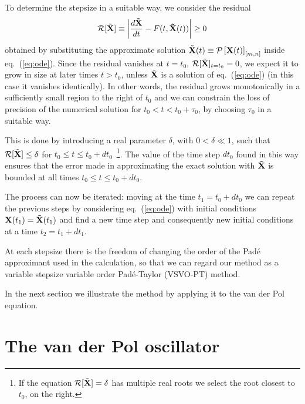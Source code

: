 \documentclass[final]{article}
\begin{document}
To determine the stepsize in a suitable way, we consider the residual 
\begin{equation}
\mathcal{R}[\tilde{\bf X}] \equiv \left|\frac{d{\bf \tilde{\bf X}}}{dt} - F(t,  {\bf \tilde{X}}(t)) \right| \geq 0
\end{equation}
obtained by substituting the approximate solution $\tilde{\bf X}(t) \equiv  \mathcal{P}\left[{\bf X}(t)\right]_{[m,n]}$ inside eq.~(\ref{eq:ode}). Since the residual vanishes at $t=t_0$,
$\mathcal{R}[\tilde{\bf X}]_{t=t_0}=0$, we expect it to grow in size at later times $t > t_0$, unless 
$\tilde{\bf X}$ is a solution of eq.~(\ref{eq:ode}) (in this case it vanishes identically). In other words, the residual grows monotonically in a sufficiently small region to the right of $t_0$ and we can constrain
the loss of precision of the numerical solution for $t_0 < t < t_0 +\tau_0$, by choosing $\tau_0$ in a suitable way.

This is done by introducing a real parameter $\delta$, with $0 < \delta \ll 1$,  such that $\mathcal{R}[\tilde{\bf X}] \leq \delta$ for $t_0 \leq t \leq t_0+dt_0$~\footnote{If  the equation $\mathcal{R}[\tilde{\bf X}] = \delta$  has multiple real roots we select the root closest to $t_0$, on the right.}.
The value of the time step $dt_0$ found in this way ensures that the error made in approximating the exact solution 
with ${\bf \tilde{X}}$ is bounded at all times $t_0 \leq t \leq t_0+dt_0$. 

The process can now be iterated: moving at the time $t_1=t_0+dt_0$ we can repeat the previous steps by considering eq.~(\ref{eq:ode}) with initial conditions ${\bf X}(t_1)= {\bf \tilde{X} }(t_1)$ and find a new time step and consequently new initial conditions at a time $t_2= t_1+dt_1$. 


At each stepsize there is the freedom of changing the order of the Pad\'e approximant used in the calculation, so that we can regard our method as a variable stepsize variable order Pad\'e-Taylor  (VSVO-PT) method.

In the next section we illustrate the method by applying it to the van der Pol equation.

\section{The van der Pol oscillator}
\label{sec:vdP}
\end{document}
